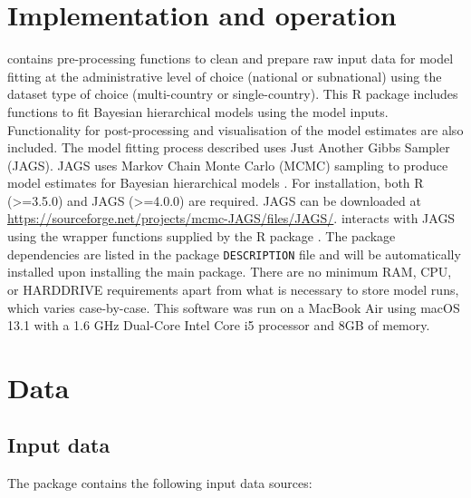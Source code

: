 \section{Implementation and operation}\label{implementation-and-operation}

 contains pre-processing functions to clean and prepare raw input data for model fitting at the administrative level of choice (national or subnational) using the dataset type of choice (multi-country or single-country). This R package includes functions to fit Bayesian hierarchical models using the model inputs. Functionality for post-processing and visualisation of the model estimates are also included. The model fitting process described uses Just Another Gibbs Sampler (JAGS). JAGS uses Markov Chain Monte Carlo (MCMC) sampling to produce model estimates for Bayesian hierarchical models \citep{Hornik2003}. For installation, both R (\textgreater=3.5.0) and JAGS (\textgreater=4.0.0) are required. JAGS can be downloaded at \url{https://sourceforge.net/projects/mcmc-JAGS/files/JAGS/}.  interacts with JAGS using the wrapper functions supplied by the R package  \citep{Su2021}. The  package dependencies are listed in the package \texttt{DESCRIPTION} file and will be automatically installed upon installing the main package. There are no minimum RAM, CPU, or HARDDRIVE requirements apart from what is necessary to store model runs, which varies case-by-case. This software was run on a MacBook Air using macOS 13.1 with a 1.6 GHz Dual-Core Intel Core i5 processor and 8GB of memory.

\section{Data}\label{data}

\subsection{Input data}\label{input-data}

The  package contains the following input data sources:

